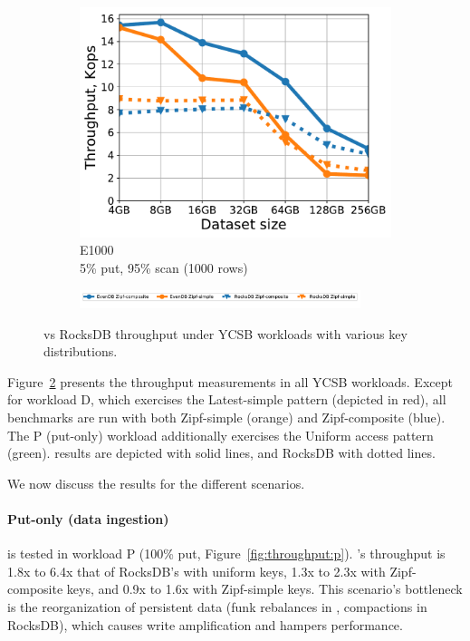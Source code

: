 \begin{figure}[tb]
\begin{subfigure}{0.32\linewidth}
\includegraphics[width=\textwidth]{figs/Workload_E+_line.pdf}
\caption{E1000 \\5\% put, 95\% scan (1000 rows)}
\label{fig:throughput:e1000}
\end{subfigure}
\begin{subfigure}{\linewidth}
\centerline{
\includegraphics[width=0.9\textwidth]{figs/legend.pdf}
\vspace{-5mm}
}
\end{subfigure}
\caption{
{\sys\/ vs RocksDB throughput under YCSB workloads with various key distributions.}
}
\label{fig:throughput}
\end{figure}

Figure~\ref{fig:throughput} presents the throughput measurements in all YCSB workloads. 
Except for workload D, which exercises the Latest-simple pattern
(depicted in red), all benchmarks are run with both  Zipf-simple (orange) 
and Zipf-composite (blue). The P (put-only) workload 
additionally exercises the Uniform access pattern (green). \sys\/ results are depicted with solid
lines, and RocksDB with dotted lines.

We now discuss the results for the different scenarios.
  
\paragraph{ Put-only (data ingestion)} is tested in workload
{P} (100\% put, Figure~\ref{fig:throughput:p}). 
\sys's throughput is 1.8x to 6.4x that of RocksDB's with uniform keys, 1.3x to 2.3x with Zipf-composite keys, 
and 0.9x to 1.6x with Zipf-simple keys. This scenario's bottleneck is the reorganization of persistent data  
(funk rebalances in \sys, compactions in RocksDB), which causes write amplification and hampers performance. 
 
